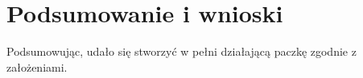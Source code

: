 \chapter{Podsumowanie i wnioski}


\quad Podsumowując, udało się stworzyć w pełni działającą paczkę zgodnie z założeniami.  